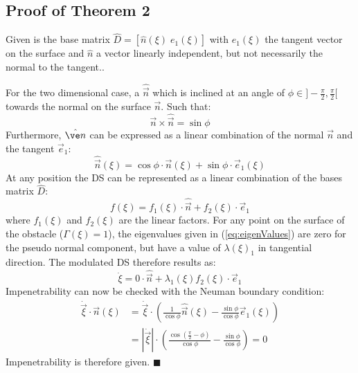 \subsection{Proof of Theorem 2} \label{sec:proof2}
Given is the base matrix $\hat{D} = [\hat n (\xi) \; e_1(\xi) ]$  with $e_1(\xi) $ the tangent vector on the surface and $\hat n$ a vector linearly independent, but not necessarily the normal to the tangent..

For the two dimensional case, a $\hat{ \vec n}$  which is inclined at an angle of $\phi \in ]-\frac{\pi}{2}, \frac{\pi}{2}[$ towards the normal on the surface $\vec n$. Such that:
\begin{equation}
{\vec n} \times \hat{\vec n} = \sin \phi
\end{equation}
Furthermore, $\hat{\ve n}$ can be expressed as a linear combination of the normal $\vec n$ and the tangent $\vec e_1$:
\begin{equation}
\hat{ \vec n} (\xi) = \cos \phi \cdot \vec n (\xi) + \sin \phi \cdot \vec e_1 (\xi)
\end{equation}
At any position the DS can be represented as a linear combination of the bases matrix $\hat D$:
\begin{equation}
  f(\xi) = f_1(\xi)\cdot \hat{\vec n} + f_2(\xi) \cdot \vec{e}_1
\end{equation}
where $f_1(\xi)$ and $f_2(\xi)$ are the linear factors.
For any point on the surface of the obstacle ($\Gamma(\xi) = 1$), the eigenvalues given in (\ref{eq:eigenValues}) are zero for the pseudo normal component, but have a value of $\lambda(\xi)_1$ in tangential direction. The modulated DS therefore results as:
\begin{equation}
  \dot \xi = 0 \cdot \hat{\vec n} + \lambda_1(\xi) f_2(\xi) \cdot \vec{e}_1
\end{equation}
Impenetrability can now be checked with the Neuman boundary condition:
\begin{align}
  \dot{\vec \xi} \cdot \vec n (\xi) &=  \dot{\vec \xi} \cdot \left(\frac{1}{\cos \phi} \hat{\vec n}(\xi) - \frac{\sin \phi}{\cos \phi} \vec{e}_1 (\xi) \right) \\
  & = \left| \dot{\vec \xi}  \right| \cdot \left(\frac{\cos(\frac{\pi}{2} - \phi)
}{\cos \phi} - \frac{\sin \phi}{\cos \phi}\right) = 0
\end{align}
Impenetrability is therefore given. \hfill $\blacksquare$



